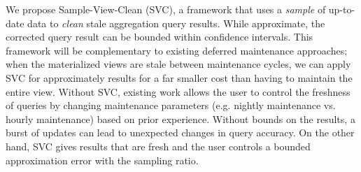 


We propose Sample-View-Clean (SVC), a framework that uses a \emph{sample} of up-to-date data to \emph{clean} stale aggregation query results.
While approximate, the corrected query result can be bounded within confidence intervals.
This framework will be complementary to existing deferred maintenance approaches; when the materialized views are stale between maintenance cycles, we can apply SVC for approximately results for a far smaller cost than having to maintain the entire view.
Without SVC, existing work allows the user to control the freshness of queries by changing maintenance parameters (e.g. nightly maintenance vs. hourly maintenance) based on prior experience.
Without bounds on the results, a burst of updates can lead to unexpected changes in query accuracy.
On the other hand, SVC gives results that are fresh and the user controls a bounded approximation error with the sampling ratio.



